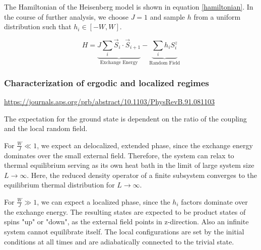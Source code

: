 \documentclass[reprint,amsmath,amssymb,aps,prb]{revtex4-2}
\begin{document}
The Hamiltonian of the Heisenberg model is shown in equation \ref{hamiltonian}. In the course of further analysis, we choose $J=1$ and sample $h$ from a uniform distribution such that $h_i \in \left[-W, W\right]$.

\begin{equation}
	H=\underbrace{J\sum_i \vec{S}_i\cdot\vec{S}_{i+1}}_{\text{Exchange Energy}}-\underbrace{\sum_ih_iS_i^z}_{\text{Random Field}}\label{hamiltonian}
\end{equation}

\subsubsection{Characterization of ergodic and localized regimes}
\url{https://journals.aps.org/prb/abstract/10.1103/PhysRevB.91.081103}\cite{Luitz2015}

%



The expectation for the ground state is dependent on the ratio of the coupling and the local random field. 

For $\frac{W}{J} \ll 1$, we expect an delocalized, extended phase, since the exchange energy dominates over the small external field. Therefore, the system can relax to thermal equilibrium serving as its own heat bath in the limit of large system size $L\rightarrow\infty$.
Here, the reduced density operator of a finite subsystem converges to the equilibrium thermal distribution
for $L\rightarrow\infty$.\cite{Pal2010}

For $\frac{W}{J} \gg 1$, we can expect a localized phase, since the $h_i$ factors dominate over the exchange energy. The resulting states are expected to be product states of spins "up" or "down", as the external field points in z-direction. Also an infinite system cannot equilibrate itself. The local configurations are set by the initial conditions at all times and are adiabatically connected to the trivial state.\cite{Pal2010}

\end{document}

